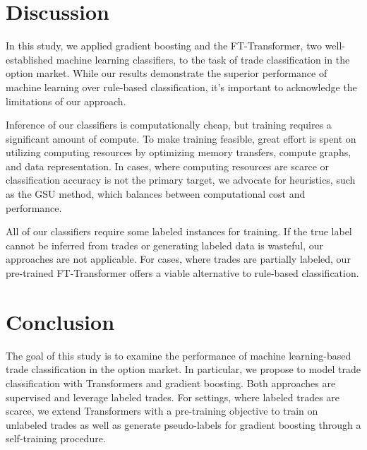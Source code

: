 \section{Discussion}\label{sec:discussion}

In this study, we applied gradient boosting and the FT-Transformer, two well-established machine learning classifiers, to the task of trade classification in the option market. While our results demonstrate the superior performance of machine learning over rule-based classification, it's important to acknowledge the limitations of our approach.

Inference of our classifiers is computationally cheap, but training requires a significant amount of compute. To make training feasible, great effort is spent on utilizing computing resources by optimizing memory transfers, compute graphs, and data representation. In cases, where computing resources are scarce or classification accuracy is not the primary target, we advocate for heuristics, such as the \gls{GSU} method, which balances between computational cost and performance.

All of our classifiers require some labeled instances for training. If the true label cannot be inferred from trades or generating labeled data is wasteful, our approaches are not applicable. For cases, where trades are partially labeled, our pre-trained FT-Transformer offers a viable alternative to rule-based classification.

\newpage
\section{Conclusion}\label{sec:conclusion}


The goal of this study is to examine the performance of machine learning-based trade classification in the option market. In particular, we propose to model trade classification with Transformers and gradient boosting. Both approaches are supervised and leverage labeled trades. For settings, where labeled trades are scarce, we extend Transformers with a pre-training objective to train on unlabeled trades as well as generate pseudo-labels for gradient boosting through a self-training procedure.

